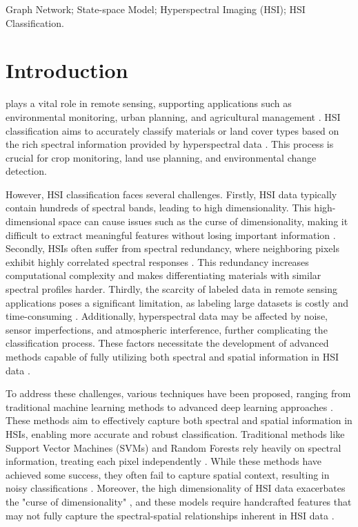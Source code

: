 \documentclass[journal]{IEEEtran}
\begin{document}
\begin{IEEEkeywords}
Graph Network; State-space Model; Hyperspectral Imaging (HSI); HSI Classification.
\end{IEEEkeywords}
\IEEEpeerreviewmaketitle
\section{Introduction}

 plays a vital role in remote sensing, supporting applications such as environmental monitoring, urban planning, and agricultural management \cite{hong2024spectralgpt}. HSI classification aims to accurately classify materials or land cover types based on the rich spectral information provided by hyperspectral data \cite{8769901}. This process is crucial for crop monitoring, land use planning, and environmental change detection.

However, HSI classification faces several challenges. Firstly, HSI data typically contain hundreds of spectral bands, leading to high dimensionality. This high-dimensional space can cause issues such as the curse of dimensionality, making it difficult to extract meaningful features without losing important information \cite{10433668}. Secondly, HSIs often suffer from spectral redundancy, where neighboring pixels exhibit highly correlated spectral responses \cite{SABIN202491,yao2022semi}. This redundancy increases computational complexity and makes differentiating materials with similar spectral profiles harder. Thirdly, the scarcity of labeled data in remote sensing applications poses a significant limitation, as labeling large datasets is costly and time-consuming \cite{5238508, AHMAD2021166267}. Additionally, hyperspectral data may be affected by noise, sensor imperfections, and atmospheric interference, further complicating the classification process. These factors necessitate the development of advanced methods capable of fully utilizing both spectral and spatial information in HSI data \cite{10559660, 10475351}.

To address these challenges, various techniques have been proposed, ranging from traditional machine learning methods to advanced deep learning approaches \cite{9645266}. These methods aim to effectively capture both spectral and spatial information in HSIs, enabling more accurate and robust classification. Traditional methods like Support Vector Machines (SVMs) \cite{CHOWDHURY2024100800} and Random Forests \cite{wu2021convolutional} rely heavily on spectral information, treating each pixel independently \cite{KUMAR2024100658}. While these methods have achieved some success, they often fail to capture spatial context, resulting in noisy classifications \cite{10538297}. Moreover, the high dimensionality of HSI data exacerbates the "curse of dimensionality" \cite{6221994, RAM2024109037}, and these models require handcrafted features that may not fully capture the spectral-spatial relationships inherent in HSI data \cite{DANIEL2024100704, 10623211}.
\end{document}
